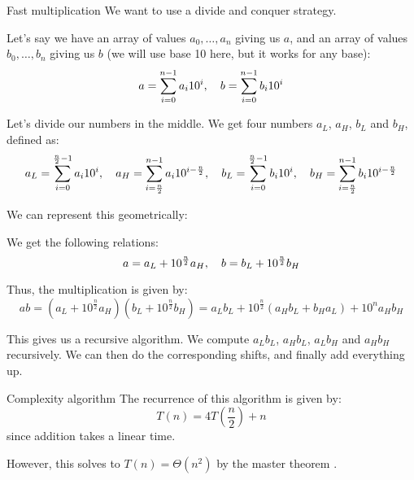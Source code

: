 \documentclass[a4paper]{article}
\begin{document}
\begin{parag}{Fast multiplication}
    We want to use a divide and conquer strategy.

    Let's say we have an array of values $a_0, \ldots, a_{n}$ giving us $a$, and an array of values $b_0, \ldots, b_n$ giving us $b$ (we will use base 10 here, but it works for any base): 
    \[a = \sum_{i=0}^{n-1} a_i 10^{i}, \quad b = \sum_{i=0}^{n-1} b_i 10^{i}\]
    
    Let's divide our numbers in the middle. We get four numbers $a_L$, $a_H$, $b_L$ and $b_H$, defined as: 
    \[a_L = \sum_{i=0}^{\frac{n}{2} - 1} a_i 10^{i}, \quad a_H = \sum_{i=\frac{n}{2}}^{n-1} a_i 10^{i - \frac{n}{2}}, \quad b_L = \sum_{i=0}^{\frac{n}{2} - 1} b_i 10^{i}, \quad b_H = \sum_{i=\frac{n}{2}}^{n-1} b_i 10^{i - \frac{n}{2}}\]

    We can represent this geometrically:

    We get the following relations: 
    \[a = a_L + 10^{\frac{n}{2}} a_H, \quad b = b_{L} + 10^{\frac{n}{2}} b_H\]
    
    Thus, the multiplication is given by: 
    \[ab = \left(a_L + 10^{\frac{n}{2}}a_H\right) \left(b_L + 10^{\frac{n}{2}}b_H\right) = a_L b_L + 10^{\frac{n}{2}} \left(a_H b_L + b_H a_L\right) + 10^n a_H b_H\]
    
    This gives us a recursive algorithm. We compute $a_L b_L$, $a_H b_L$, $a_L b_H$ and $a_H b_H$ recursively. We can then do the corresponding shifts, and finally add everything up.

    \begin{subparag}{Complexity algorithm}
        The recurrence of this algorithm is given by:
        \[T\left(n\right) = 4T\left(\frac{n}{2}\right) + n\]
        since addition takes a linear time.

        However, this solves to $T\left(n\right) = \Theta\left(n^2\right)$ by the master theorem \frownie.
    \end{subparag}
\end{parag}
\end{document}
